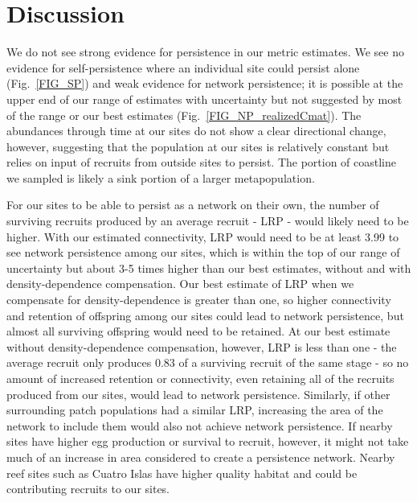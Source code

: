 \documentclass[12pt, oneside]{article}   	%
\begin{document}


\section*{Discussion}

We do not see strong evidence for persistence in our metric estimates. We see no evidence for self-persistence where an individual site could persist alone (Fig.\ \ref{FIG_SP}) and weak evidence for network persistence; it is possible at the upper end of our range of estimates with uncertainty but not suggested by most of the range or our best estimates (Fig.\ \ref{FIG_NP_realizedCmat}). The abundances through time at our sites do not show a clear directional change, however, suggesting that the population at our sites is relatively constant but relies on input of recruits from outside sites to persist. The portion of coastline we sampled is likely a sink portion of a larger metapopulation. %

For our sites to be able to persist as a network on their own, the number of surviving recruits produced by an average recruit - LRP - would likely need to be higher. With our estimated connectivity, LRP would need to be at least 3.99 to see network persistence among our sites, which is within the top of our range of uncertainty but about 3-5 times higher than our best estimates, without and with density-dependence compensation. Our best estimate of LRP when we compensate for density-dependence is greater than one, so higher connectivity and retention of offspring among our sites could lead to network persistence, but almost all surviving offspring would need to be retained. At our best estimate without density-dependence compensation, however, LRP is less than one - the average recruit only produces 0.83 of a surviving recruit of the same stage - so no amount of increased retention or connectivity, even retaining all of the recruits produced from our sites, would lead to network persistence. Similarly, if other surrounding patch populations had a similar LRP, increasing the area of the network to include them would also not achieve network persistence. If nearby sites have higher egg production or survival to recruit, however, it might not take much of an increase in area considered to create a persistence network. Nearby reef sites such as Cuatro Islas have higher quality habitat and could be contributing recruits to our sites.    %
\end{document}
